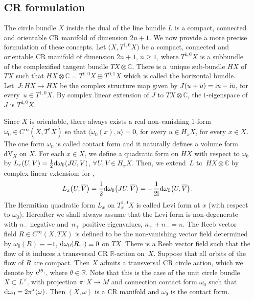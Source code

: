\documentclass[pdftex]{sigma}
\numberwithin{equation}{section}
\newcommand{\ol}{\overline}
\begin{document}
 	\subsection{CR formulation} \label{sec:crform}
 		
	The circle bundle $X$ inside the dual of the line bundle $L$ is a compact, connected and orientable CR manifold of dimension $2n+1$. We now provide a more precise formulation of these concepts. Let $\bigl(X, T^{1,0}X\bigr)$ be a compact, connected and orientable CR manifold of dimension $2n+1$, $n\geq 1$, where $T^{1,0}X$ is a subbundle of the complexified tangent bundle $ TX\otimes \mathbb{C}$. There is a~unique sub-bundle $HX$ of $TX$ such that
$
 HX\otimes \mathbb{C}=T^{1,0}X \oplus T^{0,1}X
$
 which is called the horizontal bundle. Let~${J \colon HX\rightarrow HX}$ be the complex structure map given by $J(u+\ol u)={\rm i}u-{\rm i}\ol u$, for every~${u\in T^{1,0}X}$. By complex linear extension of $J$ to $TX\otimes \mathbb{C}$, the ${\rm i}$-eigenspace of $J$ is $T^{1,0}X$.
	
	Since $X$ is orientable, there always exists a real non-vanishing $1$-form $\omega_0\in {C}^{\infty}(X,T^*X)$ so that $\langle \omega_0(x) , u \rangle=0$, for every $u\in H_xX$, for every $x\in X$. The one form $\omega_0$ is called contact form and it naturally defines a volume form $\mathrm{dV}_X$ on $X$. For each $x \in X$, we define a quadratic form on $HX$ with respect to $\omega_0$ by
	${L}_x(U,V) =\frac{1}{2}{\rm d}\omega_0(JU, V)$, $ \forall U, V \in H_xX$.
	Then, we extend~${L}$ to~${HX\otimes \mathbb{C}}$ by complex linear extension; for ,
	\[
	{L}_x\bigl(U,\overline{V}\bigr) = \frac{1}{2} {\rm d}\omega_0\bigl(JU, \overline{V}\bigr) = -\frac{1}{2{\rm i}} {\rm d}\omega_0\bigl(U,\overline{V}\bigr).
	\]
	The Hermitian quadratic form ${L}_x$ on $T^{1,0}_xX$ is called Levi form at $x$ (with respect to $\omega_0$). Hereafter we shall always assume that the Levi form is non-degenerate with $n_-$ negative and~$n_+$ positive eigenvalues, $n_++n_-=n$. The Reeb vector field $R\in{C}^\infty(X,TX)$ is defined to be the non-vanishing vector field determined by
$\omega_0(R)\equiv -1$, $ 		{\rm d}\omega_0(R,\cdot)\equiv0 $ on $ TX$.
	There is a Reeb vector field such that the flow of it induces a transversal CR $\mathbb{R}$-action on~$X$. Suppose that all orbits of the flow of $R$ are compact. Then $X$ admits a transversal CR circle action, which we denote by ${\rm e}^{{\rm i} \theta}\cdot$, where $\theta\in \mathbb{R}$. Note that this is the case of the unit circle bundle~${X\subset L^{\vee}}$, with projection $\pi\colon X\rightarrow M$ and connection contact form $\omega_0$ such that~${{\rm d}\omega_0 =2 \pi^*(\omega)}$. Then $(X, \omega)$ is a CR manifold and $\omega_0$ is the contact form.
	
\end{document}
